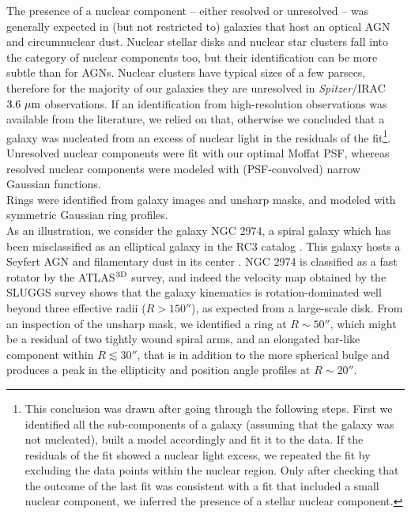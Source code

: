 \documentclass[preprint2]{emulateapj}
\begin{document}
The presence of a nuclear component -- either resolved or unresolved -- was generally expected in 
(but not restricted to) galaxies that host an optical AGN and circumnuclear dust.
Nuclear stellar disks and nuclear star clusters fall into the category of nuclear components too,
but their identification can be more subtle than for AGNs.
Nuclear clusters have typical sizes of a few parsecs, 
therefore for the majority of our galaxies they are unresolved in \emph{Spitzer}/IRAC $3.6~\rm \mu m$ observations.
If an identification from high-resolution observations was available from the literature, we relied on that, 
otherwise we concluded that a galaxy was nucleated from an excess of nuclear light in the residuals of the 
fit\footnote{This conclusion was drawn after going through the following steps. 
First we identified all the sub-components of a galaxy 
(assuming that the galaxy was not nucleated), built a model accordingly and fit it to the data.
If the residuals of the fit showed a nuclear light excess, 
we repeated the fit by excluding the data points within the nuclear region.
Only after checking that the outcome of the last fit was consistent with a fit that included a small nuclear component, 
we inferred the presence of a stellar nuclear component.}.
Unresolved nuclear components were fit with our optimal Moffat PSF,
whereas resolved nuclear components were modeled with (PSF-convolved) narrow Gaussian functions. \\
Rings were identified from galaxy images and unsharp masks, and modeled with symmetric Gaussian ring profiles. \\
As an illustration, we consider the galaxy NGC 2974, 
a spiral galaxy which has been misclassified as an elliptical galaxy in the RC3 catalog \citep{RC3}. 
This galaxy hosts a Seyfert AGN \citep{veroncettyveron2006} and filamentary dust in its center \citep{tran2001}.
NGC 2974 is classified as a fast rotator by the ATLAS$^{\rm 3D}$ survey, 
and indeed the velocity map obtained by the SLUGGS survey shows that the galaxy kinematics is rotation-dominated 
well beyond three effective radii ($R>150''$), 
as expected from a large-scale disk. 
From an inspection of the unsharp mask, we identified a ring at $R \sim 50''$, 
which might be a residual of two tightly wound spiral arms,
and an elongated bar-like component within $R \lesssim 30''$,
that is in addition to the more spherical bulge 
and produces a peak in the ellipticity and position angle profiles at $R \sim 20''$.
\end{document}
